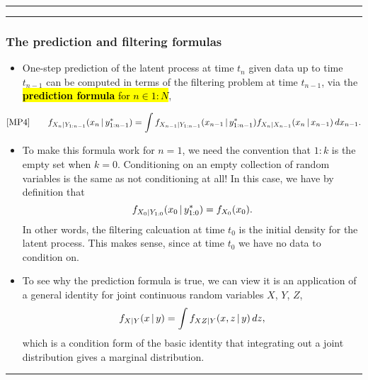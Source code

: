 \documentclass[]{article}
\providecommand{\tightlist}{%
  \setlength{\itemsep}{0pt}\setlength{\parskip}{0pt}}
\begin{document}
\begin{center}\rule{0.5\linewidth}{\linethickness}\end{center}

\begin{center}\rule{0.5\linewidth}{\linethickness}\end{center}

\subsubsection{The prediction and filtering
formulas}\label{the-prediction-and-filtering-formulas}

\begin{itemize}
\tightlist
\item
  One-step prediction of the latent process at time \(t_{n}\) given data
  up to time \(t_{n-1}\) can be computed in terms of the filtering
  problem at time \(t_{n-1}\), via the \hl{\textbf{prediction formula} for
  $n\in 1:N$},
\end{itemize}

$$\text{[MP4]}
\quad\quad \displaystyle f_{X_{n}|Y_{1:n-1}}(x_{n}{\, | \,} y_{1:n-1}^*)= \int f_{X_{n-1}|Y_{1:n-1}}(x_{n-1}{\, | \,} y_{1:n-1}^*) f_{X_{n}|X_{n-1}}(x_{n}{\, | \,} x_{n-1})\, dx_{n-1}.$$

\begin{itemize}
\item
  To make this formula work for \(n=1\), we need the convention that
  \(1:k\) is the empty set when \(k=0\). Conditioning on an empty
  collection of random variables is the same as not conditioning at all!
  In this case, we have by definition that
  \[ f_{X_{0}|Y_{1:0}}(x_{0}{\, | \,} y_{1:0}^*) = f_{X_0}(x_0).\] In
  other words, the filtering calcuation at time \(t_0\) is the initial
  density for the latent process. This makes sense, since at time
  \(t_0\) we have no data to condition on.
\item
  To see why the prediction formula is true, we can view it is an
  application of a general identity for joint continuous random
  variables \(X\), \(Y\), \(Z\),
  \[ f_{X|Y}(x{\, | \,} y)= \int f_{XZ|Y}(x,z{\, | \,} y)\, dz,\] which is a
  condition form of the basic identity that integrating out a joint
  distribution gives a marginal distribution.
\end{itemize}

\begin{center}\rule{0.5\linewidth}{\linethickness}\end{center}
\end{document}
